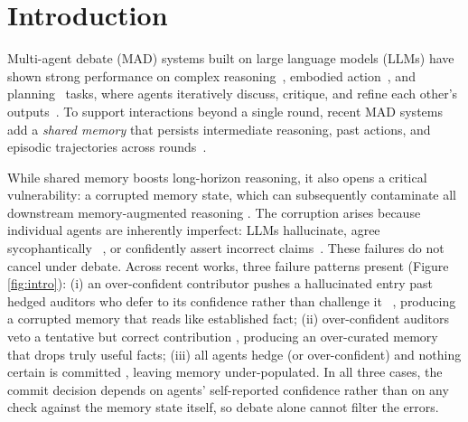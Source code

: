 \section{Introduction}
\label{sec:intro}

Multi-agent debate (MAD) systems built on large language models (LLMs) have shown strong performance on complex reasoning~\citep{du2024improving,li2024improving,meng2026small,wang2025learning}, embodied action~\citep{shridhar2020alfworld,wang2025madra}, and planning~\citep{hu2025debate,li2025swe,ma2024agentboard} tasks, where agents iteratively discuss, critique, and refine each other's outputs~\citep{chan2023chateval,liang2024encouraging,more2026theramind}. To support interactions beyond a single round, recent MAD systems add a \emph{shared memory} that persists intermediate reasoning, past actions, and episodic trajectories across rounds~\citep{anokhin2024arigraph,wang2023voyager,zhang2025g,zhong2024memorybank}.

While shared memory boosts long-horizon reasoning, it also opens a critical vulnerability: a corrupted memory state, which can subsequently contaminate all downstream memory-augmented reasoning \citep{torra2026memory}. The corruption arises because individual agents are inherently imperfect: LLMs hallucinate, agree sycophantically ~\citep{banks2026ai,carro2024flattering,sharma2023towards}, or confidently assert incorrect claims~\citep{shinn2023reflexion,yang2025eligibility,zhang2025g}. These failures do not cancel under debate. Across recent works, three failure patterns present (Figure \ref{fig:intro}): (i) an over-confident contributor pushes a hallucinated entry past hedged auditors who defer to its confidence rather than challenge it ~\citep{du2024improving,wang2024rethinking,xiong2023examining}, producing a corrupted memory that reads like established fact; (ii) over-confident auditors veto a tentative but correct contribution \citep{cui2024or,zhang2025falsereject}, producing an over-curated memory that drops truly useful facts; (iii) all agents hedge (or over-confident) and nothing certain is committed \citep{song2025llms,tang2026value,tomani2024uncertainty}, leaving memory under-populated. In all three cases, the commit decision depends on agents' self-reported confidence rather than on any check against the memory state itself, so debate alone cannot filter the errors.

